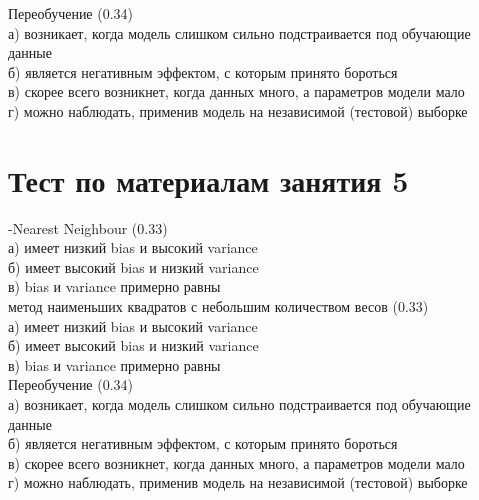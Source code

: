 \documentclass[10pt,a4paper]{article}
\begin{document}
\noindent Переобучение (0.34) \\
а) возникает, когда модель слишком сильно подстраивается под обучающие данные \\
б) является негативным эффектом, с которым принято бороться \\
в) скорее всего возникнет, когда данных много, а параметров модели мало \\
г) можно наблюдать, применив модель на независимой (тестовой) выборке \\

\section*{Тест по материалам занятия 5}

-Nearest Neighbour (0.33) \\
а) имеет низкий bias и высокий variance \\
б) имеет высокий bias и низкий variance \\
в) bias и variance примерно равны \\

\noindent метод наименьших квадратов с небольшим количеством весов (0.33) \\
а) имеет низкий bias и высокий variance \\
б) имеет высокий bias и низкий variance \\
в) bias и variance примерно равны \\

\noindent Переобучение (0.34) \\
а) возникает, когда модель слишком сильно подстраивается под обучающие данные \\
б) является негативным эффектом, с которым принято бороться \\
в) скорее всего возникнет, когда данных много, а параметров модели мало \\
г) можно наблюдать, применив модель на независимой (тестовой) выборке \\
\end{document}
